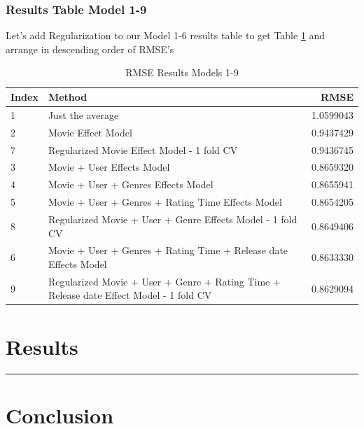 \documentclass[
]{article}
\begin{document}
\hypertarget{results-table-model-1-9}{%
\subsubsection{Results Table Model 1-9}\label{results-table-model-1-9}}

Let's add Regularization to our Model 1-6 results table to get Table
\ref{tbl:rmse_results_model_1-9} and arrange in descending order of
RMSE's

\begin{table}[H]

\caption{\label{tab:m9_4}RMSE Results Models 1-9\label{tbl:rmse_results_model_1-9}}
\centering
\fontsize{7}{9}\selectfont
\begin{tabular}[t]{llr}
\toprule
Index & Method & RMSE\\
\midrule
1 & Just the average & 1.0599043\\
2 & Movie Effect Model & 0.9437429\\
7 & Regularized Movie Effect Model - 1 fold CV & 0.9436745\\
3 & Movie + User Effects Model & 0.8659320\\
4 & Movie + User + Genres Effects Model & 0.8655941\\
5 & Movie + User + Genres + Rating Time Effects Model & 0.8654205\\
8 & Regularized Movie + User + Genre Effects Model - 1 fold CV & 0.8649406\\
6 & Movie + User + Genres + Rating Time + Release date Effects Model & 0.8633330\\
9 & Regularized Movie + User + Genre + Rating Time + Release date Effect Model - 1 fold CV & 0.8629094\\
\bottomrule
\end{tabular}
\end{table}

\newpage

\hypertarget{results}{%
\section{Results}\label{results}}

\begin{center}\rule{0.5\linewidth}{0.5pt}\end{center}

\newpage

\hypertarget{conclusion}{%
\section{Conclusion}\label{conclusion}}
\end{document}
